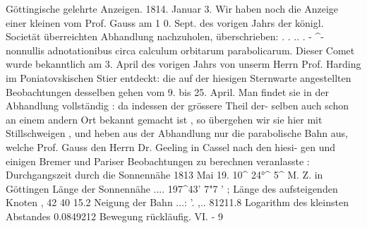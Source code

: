 \documentclass[12pt,a4paper]{article}
\begin{document}
Göttingische  gelehrte  Anzeigen.     1814.     Januar  3.
Wir  haben  noch  die  Anzeige  einer  kleinen  vom  Prof.  Gauss  am  1 0.  Sept.
des  vorigen  Jahrs  der  königl.  Societät  überreichten  Abhandlung  nachzuholen,
überschrieben:  .       .    ..  .  -    \^{}-    
nonnullis  adnotationibus  circa  calculum  orbitarum  parabolicarum.
Dieser  Comet  wurde  bekanntlich  am  3.  April  des  vorigen  Jahrs  von  unserm
Herrn  Prof.  Harding  im  Poniatovskischen  Stier  entdeckt:  die  auf  der  hiesigen
Sternwarte  angestellten  Beobachtungen  desselben  gehen  vom  9.  bis  25.  April.
Man  findet  sie  in  der  Abhandlung  vollständig :  da  indessen  der  grössere  Theil  der-
selben auch  schon  an  einem  andern  Ort  bekannt  gemacht  ist ,  so  übergehen  wir
sie  hier  mit  Stillschweigen ,  und  heben  aus  der  Abhandlung  nur  die  parabolische
Bahn  aus,  welche  Prof.  Gauss  den  Herrn  Dr.  Geeling  in  Cassel  nach  den  hiesi-
gen und  einigen  Bremer  und  Pariser  Beobachtungen  zu  berechnen  veranlasste :
Durchgangszeit  durch  die  Sonnennähe  1813  Mai  19.    10\^{}  24°\^{}  5\^{}
M.  Z.  in  Göttingen
Länge  der  Sonnennähe      ....      197\^{}43'    7"7        '    ;
Länge  des  aufsteigenden  Knoten     ,       42  40   15.2
Neigung  der  Bahn  ...:  '.     ,..       81211.8
Logarithm  des  kleinsten  Abstandes  0.0849212
Bewegung  rückläufig.
VI.  -  9

\newpage
\end{document}
